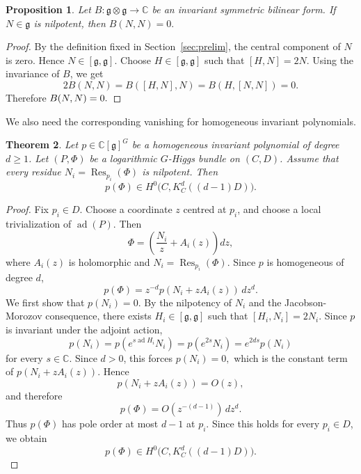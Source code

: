 \documentclass[10pt,a4paper]{amsart}
\numberwithin{equation}{section}
\newtheorem{theorem}{Theorem}[section]
\newtheorem{proposition}[theorem]{Proposition}
\begin{document}
\begin{proposition}
\label{prop:nilpotent-isotropic}
Let
\(
        B:\mathfrak g\otimes\mathfrak g\longrightarrow\mathbb C
\)
be an invariant symmetric bilinear form. If \(N\in\mathfrak g\) is nilpotent,
then
\(
        B(N,N)=0.
\)
\end{proposition}

\begin{proof}
By the definition fixed in Section~\ref{sec:prelim}, the central component of
\(N\) is zero. Hence
\(
        N\in[\mathfrak g,\mathfrak g].
\)
Choose
\(
        H\in[\mathfrak g,\mathfrak g]
\)
such that
\(
        [H,N]=2N.
\)
Using the invariance of \(B\), we get
\[
        2B(N,N)
        =
        B([H,N],N)
        =
        B(H,[N,N])
        =
        0.
\]
Therefore
\(
        B(N,N)=0. \qedhere
\)
\end{proof}

We also need the corresponding vanishing for homogeneous invariant polynomials.

\begin{theorem}
\label{thm:invpoly}
Let
\(
        p\in\mathbb C[\mathfrak g]^G
\)
be a homogeneous invariant polynomial of degree \(d\geq 1\). Let
\((P,\Phi)\) be a logarithmic \(G\)-Higgs bundle on \((C,D)\). Assume that
every residue
\(
        N_i=\operatorname{Res}_{p_i}(\Phi)
\)
is nilpotent. Then
\[
        p(\Phi)\in H^0\bigl(C,K_C^d((d-1)D)\bigr).
\]
\end{theorem}

\begin{proof}
Fix \(p_i\in D\).  Choose a coordinate \(z\) centred at \(p_i\), and choose a
local trivialization of \(\operatorname{ad}(P)\).  Then
\[
        \Phi=
        \left(
        \frac{N_i}{z}+A_i(z)
        \right)dz,
\]
where \(A_i(z)\) is holomorphic and
\(
        N_i=\operatorname{Res}_{p_i}(\Phi).
\)
Since \(p\) is homogeneous of degree \(d\),
\[
        p(\Phi)
        =
        z^{-d}p(N_i+zA_i(z))\,dz^d.
\]
We first show that
\(
        p(N_i)=0.
\)
By the nilpotency of \(N_i\) and the Jacobson-Morozov consequence, there exists
\(
        H_i\in[\mathfrak g,\mathfrak g]
\)
such that
\(
        [H_i,N_i]=2N_i.
\)
Since \(p\) is invariant under the adjoint action,
\[
        p(N_i)
        =
        p(e^{s\operatorname{ad}H_i}N_i)
        =
        p(e^{2s}N_i)
        =
        e^{2ds}p(N_i)
\]
for every \(s\in\mathbb C\).  Since \(d>0\), this forces
\(
        p(N_i)=0,
\)
which is the constant term of
\(
        p(N_i+zA_i(z)).
\)
Hence
\[
        p(N_i+zA_i(z))=O(z),
\]
and therefore
\[
        p(\Phi)=O(z^{-(d-1)})\,dz^d.
\]
Thus \(p(\Phi)\) has pole order at most \(d-1\) at \(p_i\).  Since this holds
for every \(p_i\in D\), we obtain
\[
        p(\Phi)\in H^0\bigl(C,K_C^d((d-1)D)\bigr).
\]
\end{proof}
\end{document}
